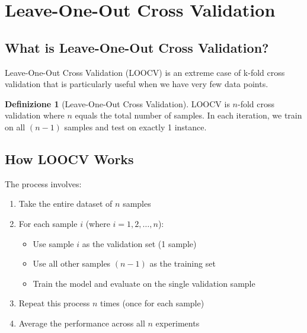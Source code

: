 \documentclass[11pt,a4paper]{article}
\theoremstyle{definition}
\newtheorem{definition}{Definizione}[section]
\theoremstyle{plain}
\theoremstyle{remark}
\begin{document}
\section{Leave-One-Out Cross Validation}

\subsection{What is Leave-One-Out Cross Validation?}

Leave-One-Out Cross Validation (LOOCV) is an extreme case of k-fold cross validation that is particularly useful when we have very few data points.

\begin{definition}[Leave-One-Out Cross Validation]
LOOCV is $n$-fold cross validation where $n$ equals the total number of samples. In each iteration, we train on all $(n-1)$ samples and test on exactly 1 instance.
\end{definition}

\subsection{How LOOCV Works}

The process involves:

\begin{enumerate}
    \item Take the entire dataset of $n$ samples
    \item For each sample $i$ (where $i = 1, 2, \ldots, n$):
    \begin{itemize}
        \item Use sample $i$ as the validation set (1 sample)
        \item Use all other samples $(n-1)$ as the training set
        \item Train the model and evaluate on the single validation sample
    \end{itemize}
    \item Repeat this process $n$ times (once for each sample)
    \item Average the performance across all $n$ experiments
\end{enumerate}
\end{document}
